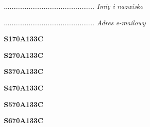 \begin{turn}{90}\begin{minipage}{\linewidth} \vspace{20mm} ................................................  \textit{Imię i nazwisko}\end{minipage}\end{turn}

\begin{turn}{90}\begin{minipage}{\linewidth} \vspace{20mm} ................................................  \textit{Adres e-mailowy}\end{minipage}\end{turn}

\begin{turn}{90}\huge \begin{minipage}{\linewidth} \vspace{10mm}\textbf{S170A133C}\end{minipage}\end{turn}

\begin{turn}{90}\huge \begin{minipage}{\linewidth} \vspace{10mm}\textbf{S270A133C}\end{minipage}\end{turn}

\begin{turn}{90}\huge \begin{minipage}{\linewidth} \vspace{10mm}\textbf{S370A133C}\end{minipage}\end{turn}

\begin{turn}{90}\huge \begin{minipage}{\linewidth} \vspace{10mm}\textbf{S470A133C}\end{minipage}\end{turn}

\begin{turn}{90}\huge \begin{minipage}{\linewidth} \vspace{10mm}\textbf{S570A133C}\end{minipage}\end{turn}

\begin{turn}{90}\huge \begin{minipage}{\linewidth} \vspace{10mm}\textbf{S670A133C}\end{minipage}\end{turn}

